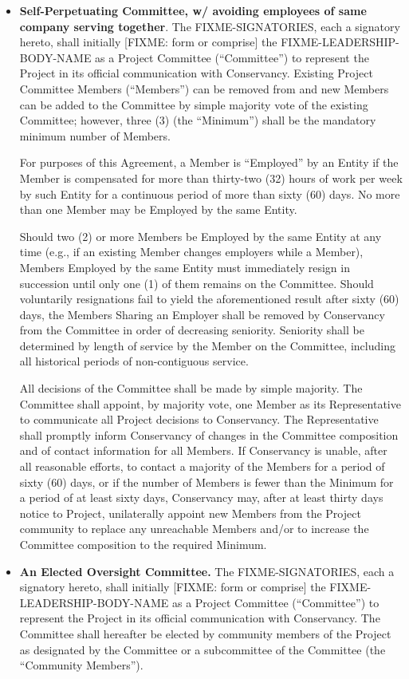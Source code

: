 \documentclass[letterpaper,12pt]{article}
\newcommand{\signatories}{FIXME-SIGNATORIES\xspace}
\newcommand{\leadershipbody}{FIXME-LEADERSHIP-BODY-NAME\xspace}
\begin{document}
\begin{enumerate}[label=\arabic*.,ref=\S~\arabic*]
\begin{itemize}
\item \textbf{Self-Perpetuating Committee, w/ avoiding employees of same
company serving together}. The \signatories, each a signatory
hereto, shall initially [FIXME: form or comprise] the \leadershipbody
as a Project Committee (``Committee'') to represent the Project
in its official communication with Conservancy. Existing Project
Committee Members (``Members'') can be removed from and new Members
can be added to the Committee by simple majority vote of the existing
Committee; however, three (3) (the ``Minimum'') shall be the mandatory
minimum number of Members.


For purposes of this Agreement, a Member is ``Employed'' by an Entity
if the Member is compensated for more than thirty-two (32) hours of
work per week by such Entity for a continuous period of more than
sixty (60) days. No more than one Member may be Employed by the same
Entity.


Should two (2) or more Members be Employed by the same Entity at any
time (e.g., if an existing Member changes employers while a Member),
Members Employed by the same Entity must immediately resign in succession
until only one (1) of them remains on the Committee. Should voluntarily
resignations fail to yield the aforementioned result after sixty (60)
days, the Members Sharing an Employer shall be removed by Conservancy
from the Committee in order of decreasing seniority. Seniority shall
be determined by length of service by the Member on the Committee,
including all historical periods of non-contiguous service.


All decisions of the Committee shall be made by simple majority. The
Committee shall appoint, by majority vote, one Member as its Representative
to communicate all Project decisions to Conservancy. The Representative
shall promptly inform Conservancy of changes in the Committee composition
and of contact information for all Members. If Conservancy is unable,
after all reasonable efforts, to contact a majority of the Members
for a period of sixty (60) days, or if the number of Members is fewer
than the Minimum for a period of at least sixty days, Conservancy
may, after at least thirty days notice to Project, unilaterally appoint
new Members from the Project community to replace any unreachable
Members and/or to increase the Committee composition to the required
Minimum.

\item \textbf{An Elected Oversight Committee.} The \signatories, each
a signatory hereto, shall initially [FIXME: form or comprise] the 
\leadershipbody as a Project Committee (``Committee'') to 
represent the Project in its official communication with Conservancy.  The
Committee shall hereafter be elected by community members of the Project as
designated by the Committee or a subcommittee of the Committee (the 
``Community Members'').  


\end{itemize}
\end{enumerate}
\end{document}
